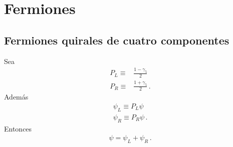 
\chapter{Fermiones}
\label{cha:fermiones}



\section{Fermiones quirales de cuatro componentes}
\label{sec:ferm-quir-de}

Sea
\begin{align}
  P_L\equiv&\frac{1-\gamma_5}{2}\nonumber\\
  P_R\equiv&\frac{1+\gamma_5}{2}\,.
\end{align}
Además
\begin{align}
  \psi_L\equiv P_L\psi\nonumber\\
  \psi_R\equiv P_R\psi\,.
\end{align}
Entonces
\begin{align}
  \psi=\psi_L+\psi_R\,.
\end{align}

